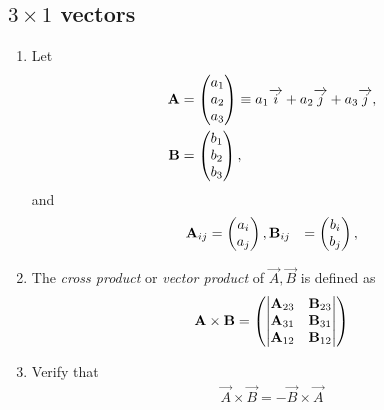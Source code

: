 \documentclass[journal,12pt,twocolumn]{IEEEtran}
\renewcommand\thesection{\arabic{section}}
\renewcommand\thesubsection{\thesection.\arabic{subsection}}
\begin{document}
\subsection{$3\times 1$ vectors}
\renewcommand{\theequation}{\theenumi}
\begin{enumerate}[label=\thesubsection.\arabic*.,ref=\thesubsection.\theenumi]

\item Let 
\begin{align}
  \mathbf{A} &= \begin{pmatrix}a_1\\a_2 \\ a_3\end{pmatrix} \equiv a_1\overrightarrow{i}+a_2\overrightarrow{j}+a_3\overrightarrow{j}, 
  \\
  \mathbf{B} &= \begin{pmatrix}b_1\\b_2 \\ b_3\end{pmatrix}, 
\end{align}
and 
\begin{align}
  \mathbf{A}_{ij} &= \begin{pmatrix}a_i\\a_j\end{pmatrix}, 
  \mathbf{B}_{ij} &= \begin{pmatrix}b_i\\b_j\end{pmatrix}, 
\end{align}

\item The {\em cross product} or {\em vector product} of $\vec{A}, \vec{B}$ is defined as
\begin{align}
  \label{eq:cross3d}
	\mathbf{A} \times \mathbf{B} = \begin{pmatrix} \begin{vmatrix}\mathbf{A}_{23} & \mathbf{B}_{23}\end{vmatrix} \\ \begin{vmatrix}\mathbf{A}_{31} & \mathbf{B}_{31}\end{vmatrix} \\ \begin{vmatrix}\mathbf{A}_{12}  & \mathbf{B}_{12}\end{vmatrix}\end{pmatrix}
\end{align}
\item Verify that
\begin{align}
  \vec{A} \times \vec{B} = -  \vec{B} \times \vec{A} 
\end{align}

\end{enumerate}
\end{document}

